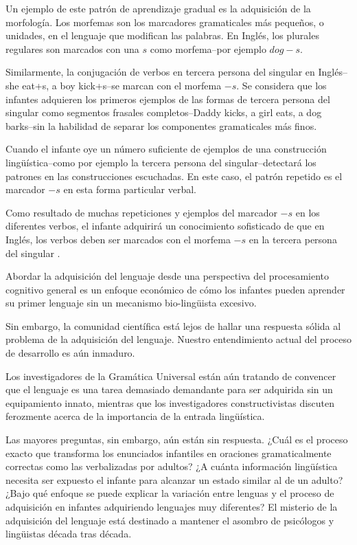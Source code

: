 Un ejemplo de este patrón de aprendizaje gradual es la adquisición de la morfología.
Los morfemas son los marcadores gramaticales más pequeños, o unidades, en el lenguaje que modifican las palabras.
En Inglés, los plurales regulares son marcados con una $s$ como morfema--por ejemplo $dog-s$.

Similarmente, la conjugación de verbos en tercera persona del singular en Inglés--she eat+s, a boy kick+s--se marcan con el morfema $-s$.
Se considera que los infantes adquieren los primeros ejemplos de las formas de tercera persona del singular como segmentos frasales completos--Daddy kicks, a girl eats, a dog barks--sin la habilidad de separar los componentes gramaticales más finos.

Cuando el infante oye un número suficiente de ejemplos de una construcción lingüística--como por ejemplo la tercera persona del singular--detectará los patrones en las construcciones escuchadas.
En este caso, el patrón repetido es el marcador $-s$ en esta forma particular verbal.

Como resultado de muchas repeticiones y ejemplos del marcador $-s$ en los diferentes verbos, el infante adquirirá un conocimiento sofisticado de que en Inglés, los verbos deben ser marcados con el morfema $-s$ en la tercera persona del singular \cite{doi:10.1111/j.1460-6984.2011.00086.x,pine_conti-ramsden_joseph_lieven_serratrice_2008,theakston_lieven_2005}.

Abordar la adquisición del lenguaje desde una perspectiva del procesamiento cognitivo general es un enfoque económico de cómo los infantes pueden aprender su primer lenguaje sin un mecanismo bio-lingüista excesivo. 

Sin embargo, la comunidad científica está lejos de hallar una respuesta sólida al problema de la adquisición del lenguaje.
Nuestro entendimiento actual del proceso de desarrollo es aún inmaduro.

Los investigadores de la Gramática Universal están aún tratando de convencer que el lenguaje es una tarea demasiado demandante para ser adquirida sin un equipamiento innato, mientras que los investigadores constructivistas discuten ferozmente acerca de la importancia de la entrada lingüística.

Las mayores preguntas, sin embargo, aún están sin respuesta.
¿Cuál es el proceso exacto que transforma los enunciados infantiles en oraciones gramaticalmente correctas como las verbalizadas por adultos?
¿A cuánta información lingüística necesita ser expuesto el infante para alcanzar un estado similar al de un adulto?
¿Bajo qué enfoque se puede explicar la variación entre lenguas y el proceso de adquisición en infantes adquiriendo lenguajes muy diferentes?
El misterio de la adquisición del lenguaje está destinado a mantener el asombro de psicólogos y lingüistas década tras década.











